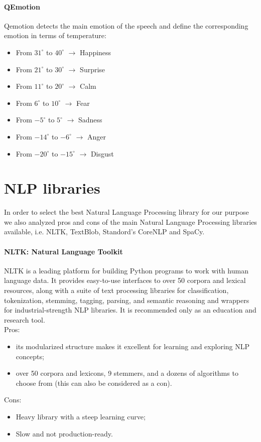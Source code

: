 \paragraph{QEmotion}\cite{qemotion}
Qemotion detects the main emotion of the speech and define the corresponding emotion in terms of temperature:
\begin{itemize}
\item From $31^{\circ}$ to $40^{\circ}$ $\to$ Happiness
\item From $21^{\circ}$ to $30^{\circ}$ $\to$ Surprise
\item From $11^{\circ}$ to $20^{\circ}$ $\to $ Calm
\item From $6^{\circ}$ to $10^{\circ}$ $\to $ Fear
\item From $-5^{\circ}$ to $5^{\circ}$ $\to $ Sadness
\item From $-14^{\circ}$ to $-6^{\circ}$ $\to $ Anger
\item From $-20^{\circ}$ to $-15^{\circ}$ $\to $ Disgust
\end{itemize}

\section{NLP libraries}
In order to select the best Natural Language Processing library for our purpose we also analyzed pros and cons of the main Natural Language Processing libraries available, i.e. NLTK, TextBlob, Standord's CoreNLP and SpaCy. 

\paragraph{NLTK: Natural Language Toolkit}
NLTK is a leading platform for building Python programs to work with human language data. It provides easy-to-use interfaces to over 50 corpora and lexical resources, along with a suite of text processing libraries for classification, tokenization, stemming, tagging, parsing, and semantic reasoning and wrappers for industrial-strength NLP libraries\cite{nltk}. It is recommended only as an education and research tool. \\
Pros:
\begin{itemize}
\item its modularized structure makes it excellent for learning and exploring NLP concepts; 
\item over 50 corpora and lexicons, 9 stemmers, and a dozens of algorithms to choose from (this can also be considered as a con).
\end{itemize}
Cons: 
\begin{itemize}
\item Heavy library with a steep learning curve;
\item Slow and not production-ready. 
\end{itemize}

